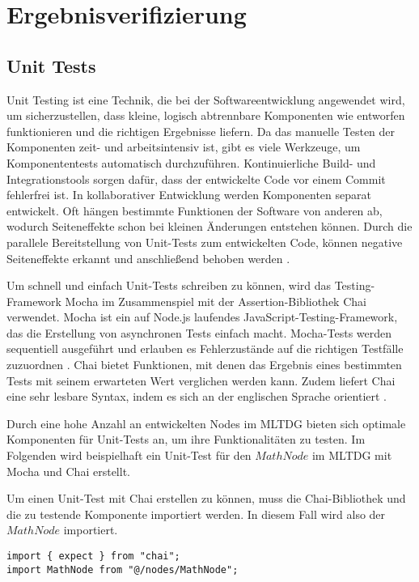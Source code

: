 
\chapter{Ergebnisverifizierung}

\section{Unit Tests}

Unit Testing ist eine Technik, die bei der Softwareentwicklung angewendet wird, um sicherzustellen, dass kleine, logisch abtrennbare Komponenten wie entworfen funktionieren und die richtigen Ergebnisse liefern. Da das manuelle Testen der Komponenten zeit- und arbeitsintensiv ist, gibt es viele Werkzeuge, um Komponententests automatisch durchzuführen. Kontinuierliche Build- und Integrationstools sorgen dafür, dass der entwickelte Code vor einem Commit fehlerfrei ist. In kollaborativer Entwicklung werden Komponenten separat entwickelt. Oft hängen bestimmte Funktionen der Software von anderen ab, wodurch Seiteneffekte schon bei kleinen Änderungen entstehen können. Durch die parallele Bereitstellung von Unit-Tests zum entwickelten Code, können negative Seiteneffekte erkannt und anschließend behoben werden \cite{Dalton2018}.

Um schnell und einfach Unit-Tests schreiben zu können, wird das Testing-Framework Mocha im Zusammenspiel mit der Assertion-Bibliothek Chai verwendet. Mocha ist ein auf Node.js laufendes JavaScript-Testing-Framework, das die Erstellung von asynchronen Tests einfach macht. Mocha-Tests werden sequentiell ausgeführt und erlauben es Fehlerzustände auf die richtigen Testfälle zuzuordnen \cite{mocha}. Chai bietet Funktionen, mit denen das Ergebnis eines bestimmten Tests mit seinem erwarteten Wert verglichen werden kann. Zudem liefert Chai eine sehr lesbare Syntax, indem es sich an der englischen Sprache orientiert \cite{chai}.

Durch eine hohe Anzahl an entwickelten Nodes im \ac{MLTDG} bieten sich optimale Komponenten für Unit-Tests an, um ihre Funktionalitäten zu testen. Im Folgenden wird beispielhaft ein Unit-Test für den $MathNode$ im \ac{MLTDG} mit Mocha und Chai erstellt.

Um einen Unit-Test mit Chai erstellen zu können, muss die Chai-Bibliothek und die zu testende Komponente importiert werden. In diesem Fall wird also der $MathNode$ importiert.

\begin{lstlisting}[caption=Unit-Test: Import,label=unit1]
import { expect } from "chai";
import MathNode from "@/nodes/MathNode";
\end{lstlisting}

